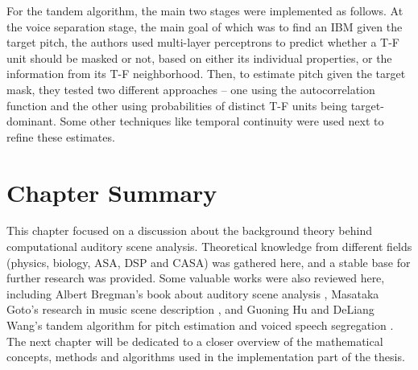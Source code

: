 For the tandem algorithm, the main two stages were implemented as follows. At the voice separation stage, the main goal of which was to find an IBM given the target pitch, the authors used multi-layer perceptrons to predict whether a T-F unit should be masked or not, based on either its individual properties, or the information from its T-F neighborhood. Then, to estimate pitch given the target mask, they tested two different approaches -- one using the autocorrelation function and the other using probabilities of distinct T-F units being target-dominant. Some other techniques like temporal continuity were used next to refine these estimates.


\section{Chapter Summary}

This chapter focused on a discussion about the background theory behind computational auditory scene analysis. Theoretical knowledge from different fields (physics, biology, ASA, DSP and CASA) was gathered here, and a stable base for further research was provided. Some valuable works were also reviewed here, including Albert Bregman's book about auditory scene analysis \cite{Bregman1990}, Masataka Goto's research in music scene description \cite{Goto2004}\cite{Goto2006}, and Guoning Hu and DeLiang Wang's tandem algorithm for pitch estimation and voiced speech segregation \cite{Hu2010}. The next chapter will be dedicated to a closer overview of the mathematical concepts, methods and algorithms used in the implementation part of the thesis.
